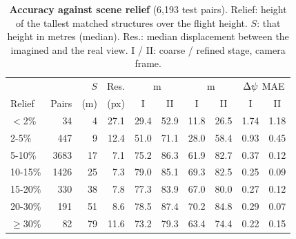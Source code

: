 \begin{table}[t]
\centering
\caption{\textbf{Accuracy against scene relief} (6{,}193 test pairs). Relief: height of the tallest matched structures over the flight height. $S$: that height in metres (median). Res.: median displacement between the imagined and the real view. I / II: coarse / refined stage, camera frame.}
\label{tab:planarity}
\footnotesize
\setlength{\tabcolsep}{2.6pt}
\begin{tabular}{@{}lrrrcccccc@{}}
\toprule
& & $S$ & Res. & \multicolumn{2}{c}{\SRd@1\,m} & \multicolumn{2}{c}{\SRe@1\,m} & \multicolumn{2}{c}{$\Delta\psi$ MAE} \\
Relief & Pairs & (m) & (px) & I & II & I & II & I & II \\
\midrule
$<$2\% & 34 & 4 & 27.1 & 29.4 & 52.9 & 11.8 & 26.5 & 1.74 & 1.18 \\
2-5\% & 447 & 9 & 12.4 & 51.0 & 71.1 & 28.0 & 58.4 & 0.93 & 0.45 \\
5-10\% & 3683 & 17 & 7.1 & 75.2 & 86.3 & 61.9 & 82.7 & 0.37 & 0.12 \\
10-15\% & 1426 & 25 & 7.3 & 79.0 & 85.1 & 69.3 & 82.5 & 0.25 & 0.09 \\
15-20\% & 330 & 38 & 7.8 & 77.3 & 83.9 & 67.0 & 80.0 & 0.27 & 0.12 \\
20-30\% & 191 & 51 & 8.6 & 78.5 & 87.4 & 70.2 & 84.8 & 0.29 & 0.07 \\
$\geq$30\% & 82 & 79 & 11.6 & 73.2 & 79.3 & 63.4 & 74.4 & 0.22 & 0.15 \\
\bottomrule
\end{tabular}
\end{table}

